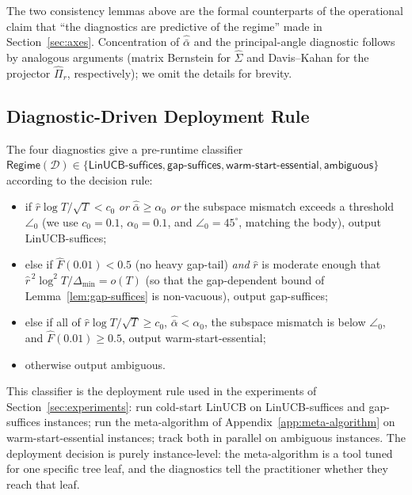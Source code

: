 \documentclass{article}
\theoremstyle{definition}
\theoremstyle{remark}
\theoremstyle{remark}
\begin{document}
The two consistency lemmas above are the formal counterparts of the
operational claim that ``the diagnostics are predictive of the regime''
made in Section~\ref{sec:axes}. Concentration of $\widehat{\bar\alpha}$
and the principal-angle diagnostic follows by analogous arguments
(matrix Bernstein for $\widehat\Sigma$ and Davis--Kahan for the
projector $\widehat\Pi_r$, respectively); we omit the details for
brevity.

\subsection{Diagnostic-Driven Deployment Rule}
\label{app:deployment-rule}

The four diagnostics give a pre-runtime classifier
$\mathsf{Regime}(\mathcal D)\in\{\textsf{LinUCB-suffices},
\textsf{gap-suffices},\textsf{warm-start-essential},\textsf{ambiguous}\}$
according to the decision rule:
\begin{itemize}[itemsep=2pt,topsep=2pt]
\item if $\widehat r\log T/\sqrt T < c_0$ \emph{or} $\widehat{\bar\alpha}\ge\alpha_0$
\emph{or} the subspace mismatch exceeds a threshold $\angle_0$ (we use
$c_0=0.1$, $\alpha_0=0.1$, and $\angle_0=45^\circ$, matching the body),
output \textsf{LinUCB-suffices};
\item else if $\widehat F(0.01) < 0.5$ (no heavy gap-tail) \emph{and}
$\widehat r$ is moderate enough that
$\widehat r^{\,2}\log^2 T/\Delta_{\min}=o(T)$ (so that the
gap-dependent bound of Lemma~\ref{lem:gap-suffices} is non-vacuous),
output \textsf{gap-suffices};
\item else if all of $\widehat r\log T/\sqrt T \ge c_0$,
$\widehat{\bar\alpha} < \alpha_0$, the subspace mismatch is below $\angle_0$,
and $\widehat F(0.01)\ge 0.5$, output \textsf{warm-start-essential};
\item otherwise output \textsf{ambiguous}.
\end{itemize}
This classifier is the deployment rule used in the experiments of
Section~\ref{sec:experiments}: run cold-start LinUCB on
\textsf{LinUCB-suffices} and \textsf{gap-suffices} instances; run the
meta-algorithm of Appendix~\ref{app:meta-algorithm} on
\textsf{warm-start-essential} instances; track both in parallel
on \textsf{ambiguous} instances. The deployment decision is purely
instance-level: the meta-algorithm is a tool tuned for one specific
tree leaf, and the diagnostics tell the practitioner whether they
reach that leaf.
\end{document}

